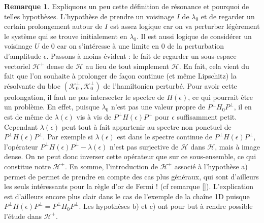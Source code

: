 \documentclass[12pt,openany,a4paper, titlepage]{article}
\theoremstyle{definition}
\theoremstyle{definition}
\theoremstyle{definition}
\theoremstyle{definition}
\theoremstyle{definition}
\newtheorem{rem}{Remarque}
\theoremstyle{definition}
\begin{document}
\begin{rem}
Expliquons un peu cette définition de résonance et pourquoi de telles hypothèses. L'hypothèse de prendre un voisinage $I$ de $\lambda_0$ et de regarder un certain prolongement autour de $I$ est assez logique car on va perturber légèrement le système qui se trouve initialement en $\lambda_0$. Il est aussi logique de considérer un voisinage $U$ de $0$ car on s'intéresse à une limite en $0$ de la perturbation d'amplitude $\epsilon$. Passons à moins évident : le fait de regarder un sous-espace vectoriel $\mathcal{H}^+$ dense de $\mathcal{H}$ au lieu de tout simplement $\mathcal{H}$. En fait, cela vient du fait que l'on souhaite à prolonger de façon continue (et même Lipschitz) la résolvante du bloc $(\mathcal{K}_0^\perp,\mathcal{K}_0^\perp)$ de l'hamiltonien perturbé. Pour avoir cette prolongation, il faut ne pas intersecter le spectre de $H(\epsilon)$, ce qui pourrait être un problème. En effet, puisque $\lambda_0$ n'est pas une valeur propre de $P^\perp H_0 P^\perp$, il en est de même de $\lambda(\epsilon)$ vis à vis de $P^\perp H(\epsilon)P^\perp$ pour $\epsilon$ suffisamment petit. Cependant $\lambda(\epsilon)$ peut tout à fait appartenir au spectre non ponctuel de $P^\perp H(\epsilon)P^\perp$. Par exemple si $\lambda(\epsilon)$ est dans le spectre continue de $P^\perp H(\epsilon)P^\perp$, l'opérateur $P^\perp H(\epsilon)P^\perp - \lambda(\epsilon)$ n'est pas surjective de $\mathcal{H}$ dans $\mathcal{H}$, mais à image dense. On ne peut donc inverser cette opérateur que sur ce sous-ensemble, ce qui constitue notre $\mathcal{H}^+$. En somme, l'introduction de $\mathcal{H}^+$ associé à l'hypothèse a) permet de permet de prendre en compte des cas plus généraux, qui sont d'ailleurs les seuls intéressants pour la règle d'or de Fermi ! (cf remarque []). L'explication est d'ailleurs encore plus clair dans le cas de l'exemple de la chaîne 1D puisque $P^\perp H(\epsilon) P^\perp = P^\perp H_0 P^\perp$. Les hypothèses b) et c) ont pour but à rendre possible l'étude dans $\mathcal{H}^+$.\\


\end{rem}
\end{document}
